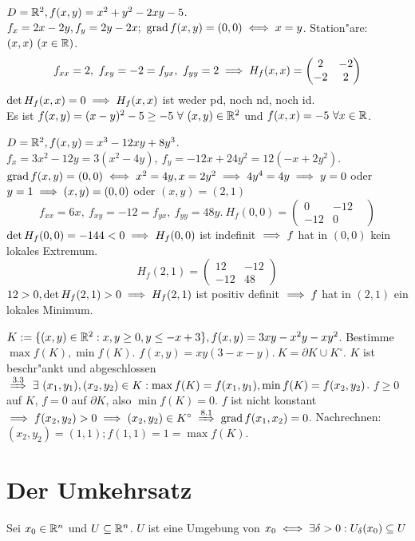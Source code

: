\documentclass[a4paper,twoside,DIV15,BCOR12mm]{scrbook}
\begin{document}
\begin{beispiele}
\item $D=\mathbb{R}^2, f(x,y)=x^2+y^2-2xy-5$. $f_x=2x-2y, f_y=2y-2x;\ \grad f(x,y)=(0,0)\equizu x=y$. Station"are: $(x,x)\ (x\in\mathbb{R})$.\\
$$f_{xx}=2,\ f_{xy}=-2=f_{yx},\ f_{yy}=2\folgt H_f(x,x)=\begin{pmatrix}2&-2\\-2&2\end{pmatrix}$$
$\det H_f(x,x)=0\implies H_f(x,x)$ ist weder pd, noch nd, noch id.\\
Es ist $f(x,y)=(x-y)^2-5\ge -5\ \forall\ (x,y)\in\MdR^2$ und $f(x,x)=-5\ \forall x\in\mathbb{R}$.
\item $D=\mathbb{R}^2, f(x,y)=x^3-12xy+8y^3$.\\
$f_x=3x^2-12y=3(x^2-4y),\ f_y=-12x+24y^2=12(-x+2y^2)$. $\grad f(x,y)=(0,0)\equizu x^2=4y, x=2y^2\folgt 4y^4=4y\folgt y=0$ oder $y=1\implies (x,y)=(0,0)$ oder $(x,y)=(2,1)$\\
$$f_{xx}=6x,\ f_{xy}=-12=f_{yx},\ f_{yy}=48y.\ H_f(0,0)=\begin{pmatrix}0&-12&\\-12&0\end{pmatrix}$$
$\det H_f(0,0)=-144<0\implies H_f(0,0)$ ist indefinit $\implies f$ hat in $(0,0)$ kein lokales Extremum. 
$$H_f(2,1)=\begin{pmatrix}12&-12\\-12&48\end{pmatrix}$$
$12>0, \det H_f(2,1)>0\implies H_f(2,1)$ ist positiv definit $\implies f$ hat in $(2,1)$ ein lokales Minimum.
\item $K:=\{(x,y)\in\mathbb{R}^2: x,y\ge 0, y\le -x+3\}, f(x,y)=3xy-x^2y-xy^2$. Bestimme $\max f(K), \min f(K)$. $f(x,y)=xy(3-x-y).\ K=\partial K \cup K^\circ$. $K$ ist beschr"ankt und abgeschlossen $\folgtnach{3.3}\exists\ (x_1,y_1), (x_2,y_2)\in K: \max f(K)=f(x_1, y_1), \min f(K)=f(x_2,y_2)$. $f\ge 0$ auf $K$, $f=0$ auf $\partial K$, also $\min f(K)=0$. $f$ ist nicht konstant $\folgt f(x_2,y_2)>0\folgt (x_2,y_2)\in K^\circ\folgtnach{8.1}\grad f(x_1,x_2)=0$. Nachrechnen: $(x_2,y_2)=(1,1); f(1,1)=1=\max f(K)$.
\end{beispiele}

\chapter{Der Umkehrsatz}
\def\grad{\mathop{\rm grad}\nolimits}

\begin{erinnerung}
Sei $x_0\in\mathbb{R}^n$ und $U\subseteq\mathbb{R}^n$. $U$ ist eine Umgebung von $x_0\iff\exists\delta>0:U_\delta(x_0)\subseteq U$
\end{erinnerung}
\end{document}
